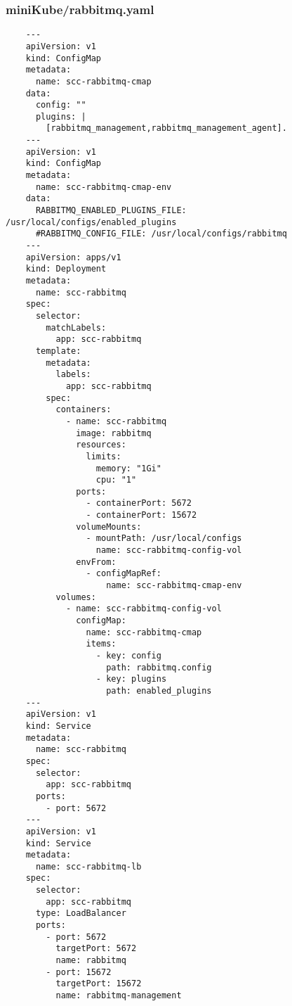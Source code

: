 \documentclass[runningheads]{llncs}
\begin{document}
\subsubsection{miniKube/rabbitmq.yaml}
\begin{verbatim}
    ---
    apiVersion: v1
    kind: ConfigMap
    metadata:
      name: scc-rabbitmq-cmap
    data:
      config: ""
      plugins: |
        [rabbitmq_management,rabbitmq_management_agent].
    ---
    apiVersion: v1
    kind: ConfigMap
    metadata:
      name: scc-rabbitmq-cmap-env
    data:
      RABBITMQ_ENABLED_PLUGINS_FILE: /usr/local/configs/enabled_plugins
      #RABBITMQ_CONFIG_FILE: /usr/local/configs/rabbitmq
    ---
    apiVersion: apps/v1
    kind: Deployment
    metadata:
      name: scc-rabbitmq
    spec:
      selector:
        matchLabels:
          app: scc-rabbitmq
      template:
        metadata:
          labels:
            app: scc-rabbitmq
        spec:
          containers:
            - name: scc-rabbitmq
              image: rabbitmq
              resources:
                limits:
                  memory: "1Gi"
                  cpu: "1"
              ports:
                - containerPort: 5672
                - containerPort: 15672
              volumeMounts:
                - mountPath: /usr/local/configs
                  name: scc-rabbitmq-config-vol
              envFrom:
                - configMapRef:
                    name: scc-rabbitmq-cmap-env
          volumes:
            - name: scc-rabbitmq-config-vol
              configMap:
                name: scc-rabbitmq-cmap
                items:
                  - key: config
                    path: rabbitmq.config
                  - key: plugins
                    path: enabled_plugins
    ---
    apiVersion: v1
    kind: Service
    metadata:
      name: scc-rabbitmq
    spec:
      selector:
        app: scc-rabbitmq
      ports:
        - port: 5672
    ---
    apiVersion: v1
    kind: Service
    metadata:
      name: scc-rabbitmq-lb
    spec:
      selector:
        app: scc-rabbitmq
      type: LoadBalancer
      ports:
        - port: 5672
          targetPort: 5672
          name: rabbitmq
        - port: 15672
          targetPort: 15672
          name: rabbitmq-management
\end{verbatim}
\end{document}
